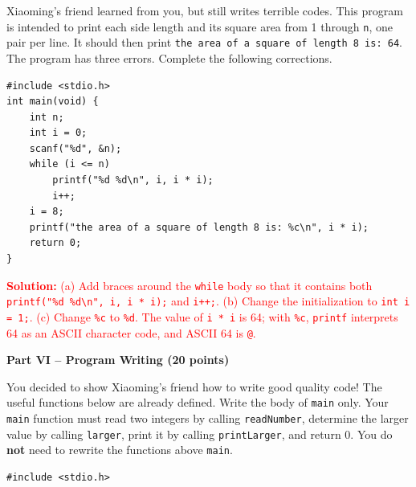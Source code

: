 \documentclass[12pt,a4paper,addpoints]{exam}
\newcommand{\answertext}[1]{%
  \ifprintanswers\par\noindent\textcolor{red}{\textbf{Solution:} #1}\par\fi}
\newcommand{\studentspace}[1]{\ifprintanswers\else\vspace{#1}\fi}
\begin{document}
\begin{questions}
\question Xiaoming's friend learned from you, but still writes terrible codes. This program is intended to print each side length and its square area from 1 through \texttt{n}, one pair per line. It should then print \texttt{the area of a square of length 8 is: 64}. The program has three errors. Complete the following corrections.
\begin{lstlisting}
#include <stdio.h>
int main(void) {
    int n;
    int i = 0;
    scanf("%d", &n);
    while (i <= n)
        printf("%d %d\n", i, i * i);
        i++;
    i = 8;
    printf("the area of a square of length 8 is: %c\n", i * i);
    return 0;
}
\end{lstlisting}
\studentspace{4.0cm}
\answertext{(a) Add braces around the \texttt{while} body so that it contains both \texttt{printf("\%d \%d\textbackslash n", i, i * i);} and \texttt{i++;}. (b) Change the initialization to \texttt{int i = 1;}. (c) Change \texttt{\%c} to \texttt{\%d}. The value of \texttt{i * i} is 64; with \texttt{\%c}, \texttt{printf} interprets 64 as an ASCII character code, and ASCII 64 is \texttt{@}.}

\newpage
\begin{center}\large\textbf{Part VI -- Program Writing (20 points)}\end{center}

\question[10] You decided to show Xiaoming's friend how to write good quality code! The useful functions below are already defined. Write the body of \texttt{main} only. Your \texttt{main} function must read two integers by calling \texttt{readNumber}, determine the larger value by calling \texttt{larger}, print it by calling \texttt{printLarger}, and return 0. You do \textbf{not} need to rewrite the functions above \texttt{main}.
\begin{lstlisting}
#include <stdio.h>


\end{lstlisting}
\end{questions}
\end{document}
